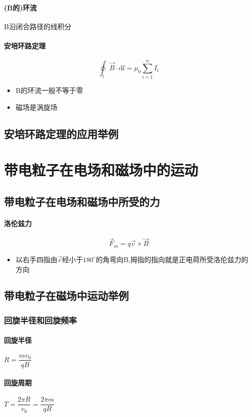 \documentclass[UTF8,a4paper,12pt,scheme=chinese]{ctexbook}
\newcommand{\sll}[1]{\overrightarrow{#1}}
\newcommand{\ud}{\mathrm{d}}
\begin{document}
	\paragraph{(B的)环流}B沿闭合路径的线积分
	\paragraph{安培环路定理}$$ \oint_l\sll{B}\cdot\ud{l}=\mu_0\sum^n_{i=1}I_i $$
	\begin{itemize}
		\item B的环流一般不等于零
		\item 磁场是涡旋场
	\end{itemize}
	\subsection{安培环路定理的应用举例}
	
	\section{带电粒子在电场和磁场中的运动}
	\subsection{带电粒子在电场和磁场中所受的力}
	\paragraph{洛伦兹力}
	$$ \sll{F}_m=q\sll{v}\times\sll{B} $$
	\begin{itemize}
		\item 以右手四指由$ \sll{v} $经小于$ 180^\circ $的角弯向B,拇指的指向就是正电荷所受洛伦兹力的方向
	\end{itemize}
	\subsection{带电粒子在磁场中运动举例}
	\subsubsection{回旋半径和回旋频率}
	\paragraph{回旋半径}$ R=\dfrac{mv_0}{qB} $
	\paragraph{回旋周期}$ T=\dfrac{2\pi R}{v_0}=\dfrac{2\pi m}{qB} $
\end{document}
